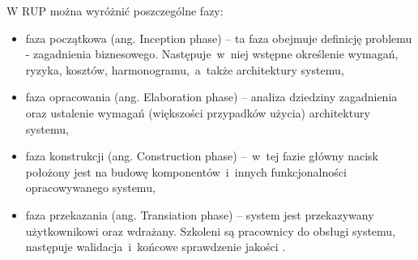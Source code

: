 W RUP można wyróżnić poszczególne fazy:
\begin{itemize}
\item{faza początkowa (ang. Inception phase) – ta faza obejmuje definicję problemu - zagadnienia biznesowego. Następuje~w~niej wstępne określenie wymagań, ryzyka, kosztów, harmonogramu,~a~także architektury systemu,}
\item{faza opracowania (ang. Elaboration phase) – analiza dziedziny zagadnienia oraz ustalenie wymagań (większości przypadków użycia) architektury systemu,}
\item{faza konstrukcji (ang. Construction phase) –~w~tej fazie główny nacisk położony jest na budowę komponentów~i~innych funkcjonalności opracowywanego systemu,}
\item{faza przekazania (ang. Transiation phase) – system jest przekazywany użytkownikowi oraz wdrażany. Szkoleni są pracownicy do obsługi systemu, następuje walidacja~i~końcowe sprawdzenie jakości \cite{RUPIntRat}. } 
\end{itemize}


